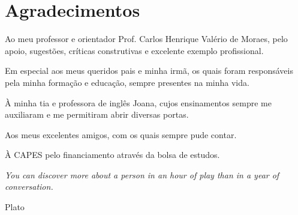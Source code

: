\chapter*{Agradecimentos}

Ao meu professor e orientador Prof. Carlos Henrique Valério de Moraes, pelo apoio, sugestões, críticas construtivas e excelente exemplo profissional.

Em especial aos meus queridos pais e minha irmã, os quais foram responsáveis pela minha formação e educação, sempre presentes na minha vida.

À minha tia e professora de inglês Joana, cujos ensinamentos sempre me auxiliaram e me permitiram abrir diversas portas.

Aos meus excelentes amigos, com os quais sempre pude contar.

À CAPES pelo financiamento através da bolsa de estudos.

\vfill

\hfill

\begin{flushright}

\small
\parbox{.6\textwidth}{\emph{You can discover more about a person in an hour of play than in a year of conversation.}}

Plato

\end{flushright}